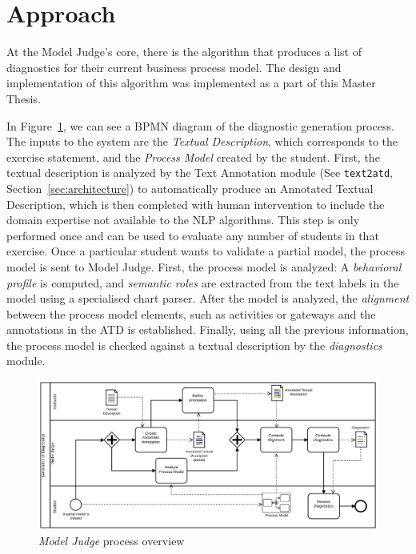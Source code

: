 \section{Approach}
\label{sec:modeljudge_approach}

At the Model Judge's core, there is the algorithm that produces a list of
diagnostics for their current business process model. The design and
implementation of this algorithm was implemented as a part of this Master Thesis.

In Figure~\ref{fig:modeljudge_overview}, we can see a BPMN diagram of the
diagnostic generation process. The inputs to the system are the \emph{Textual
  Description}, which corresponds to the exercise statement, and the
\emph{Process Model} created by the student. First, the textual description is
analyzed by the Text Annotation module (See \texttt{text2atd},
Section~\ref{sec:architecture}) to automatically produce an Annotated
Textual Description, which is then completed with human intervention to include
the domain expertise not available to the NLP algorithms. This step is only
performed once and can be used to evaluate any number of students in that
exercise. Once a particular student wants to validate a partial model, the
process model is sent to Model Judge. First, the process model is
analyzed: A \emph{behavioral profile} is computed, and \emph{semantic roles} are
extracted from the text labels in the model using a specialised chart parser.
After the model is analyzed, the \textit{alignment} between the process model
elements, such as activities or gateways and the annotations in the ATD is
established. Finally, using all the previous information, the process model is
checked against a textual description by the \emph{diagnostics} module.

\begin{figure}[htb]
  \centering
  \includegraphics[width=\textwidth]{figures/overview_bpmn}
  \caption{\emph{Model Judge} process overview}
  \label{fig:modeljudge_overview}
\end{figure}


